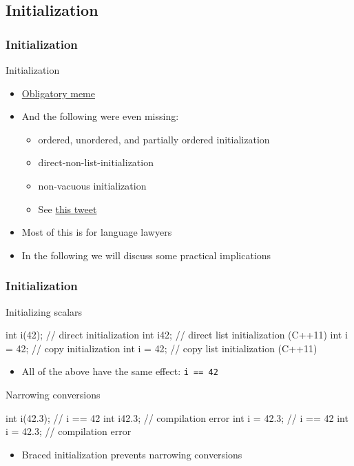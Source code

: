 \subsection[Init]{Initialization}

\begin{frame}[fragile]
  \frametitle{Initialization}
  \begin{block}{Initialization}
    \begin{itemize}
      \item \href{https://imgur.com/3wlxtI0}{Obligatory meme}
      \pause
      \item And the following were even missing:
      \begin{itemize}
        \item ordered, unordered, and partially ordered initialization
        \item direct-non-list-initialization
        \item non-vacuous initialization
        \item See \href{https://twitter.com/timur_audio/status/1004017362381795329}{this tweet}
      \end{itemize}
      \item Most of this is for language lawyers
      \item In the following we will discuss some practical implications
    \end{itemize}
  \end{block}
\end{frame}

\begin{frame}[fragile]
  \frametitle{Initialization}
  \begin{block}{Initializing scalars}
    \begin{cppcode}
      int i(42);    // direct initialization
      int i{42};    // direct list initialization (C++11)
      int i = 42;   // copy initialization
      int i = {42}; // copy list initialization (C++11)
    \end{cppcode}
    \begin{itemize}
      \item All of the above have the same effect: \texttt{i == 42}
    \end{itemize}
  \end{block}
  \begin{block}{Narrowing conversions}
    \begin{cppcode}
      int i(42.3);    // i == 42
      int i{42.3};    // compilation error
      int i = 42.3;   // i == 42
      int i = {42.3}; // compilation error
    \end{cppcode}
    \begin{itemize}
      \item Braced initialization prevents narrowing conversions
    \end{itemize}
  \end{block}
\end{frame}

